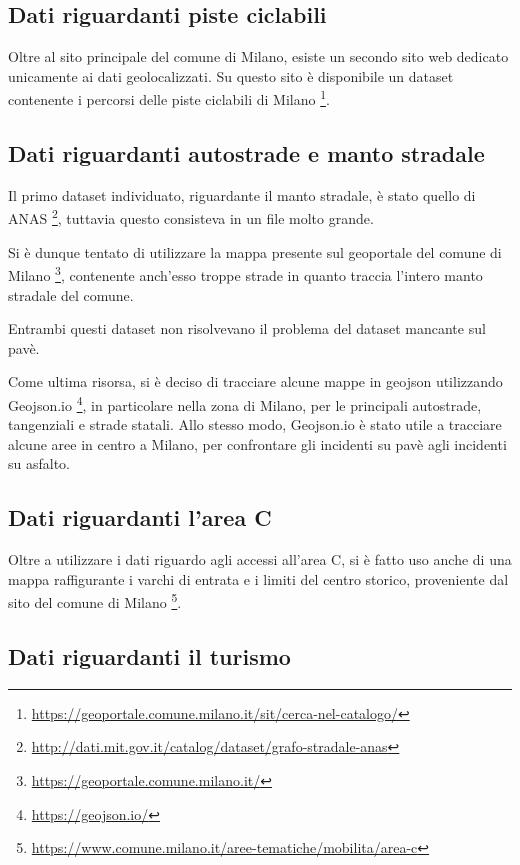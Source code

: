 \documentclass[a4paper]{report}
\begin{document}
\subsection{Dati riguardanti piste ciclabili}
Oltre al sito principale del comune di Milano, esiste un secondo sito web dedicato 
unicamente ai dati geolocalizzati. Su questo sito è disponibile un dataset contenente 
i percorsi delle piste ciclabili di Milano
\footnote{\url{https://geoportale.comune.milano.it/sit/cerca-nel-catalogo/}}.

\subsection{Dati riguardanti autostrade e manto stradale}

Il primo dataset individuato, riguardante il manto  stradale, è stato quello di ANAS
\footnote{\url{http://dati.mit.gov.it/catalog/dataset/grafo-stradale-anas}}, 
tuttavia questo consisteva in un file molto grande.

Si è dunque tentato di utilizzare la mappa presente sul geoportale del comune di Milano
\footnote{\url{https://geoportale.comune.milano.it/}}, 
contenente anch'esso troppe strade in quanto traccia l'intero manto stradale del comune.

Entrambi questi dataset non risolvevano il problema del dataset mancante sul pavè.

Come ultima risorsa, si è deciso di tracciare alcune mappe in geojson utilizzando Geojson.io
\footnote{\url{https://geojson.io/}}, in particolare nella zona di Milano, per le principali 
autostrade, tangenziali e strade statali. 
Allo stesso modo, Geojson.io è stato utile a tracciare alcune aree in centro a Milano, per confrontare 
gli incidenti su pavè agli incidenti su asfalto.

\subsection{Dati riguardanti l'area C}

Oltre a utilizzare i dati riguardo agli accessi all'area C, si è fatto uso anche di una mappa 
raffigurante i varchi di entrata e i limiti del centro storico, 
proveniente dal sito del comune di Milano
\footnote{\url{https://www.comune.milano.it/aree-tematiche/mobilita/area-c}}.


\subsection{Dati riguardanti il turismo}
\end{document}
